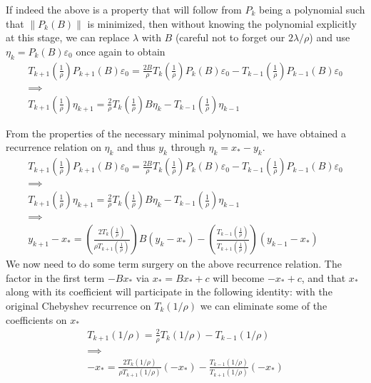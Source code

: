 \documentclass[11pt]{article}
\begin{document}
If indeed the above is a property that will follow from $P_k$ being a polynomial such that $\lVert P_k(B) \rVert$ is minimized, then without knowing the polynomial explicitly at this stage, we can replace $\lambda$ with $B$ (careful not to forget our $2\lambda/\rho$) and use $\eta_k = P_k(B) \varepsilon_0$ once again to obtain \begin{gather*}
T_{k+1}\left(\frac1\rho\right) P_{k+1}(B) \varepsilon_0 = \frac{2B}{\rho} T_k\left(\frac1\rho\right) P_k(B) \varepsilon_0 - T_{k-1}\left(\frac1\rho \right) P_{k-1} (B) \varepsilon_0 \\
\implies \\
T_{k+1}\left(\frac1\rho\right) \eta_{k+1} = \frac{2}{\rho} T_k\left(\frac1\rho\right) B \eta_k - T_{k-1}\left(\frac1\rho \right) \eta_{k-1}
\end{gather*}

From the properties of the necessary minimal polynomial, we have obtained a recurrence relation on $\eta_k$ and thus $y_k$ through $\eta_k = x_* - y_k$. \begin{gather*}
T_{k+1}\left(\frac1\rho\right) P_{k+1}(B) \varepsilon_0 = \frac{2B}{\rho} T_k\left(\frac1\rho\right) P_k(B) \varepsilon_0 - T_{k-1}\left(\frac1\rho \right) P_{k-1} (B) \varepsilon_0 \\
\implies \\
T_{k+1}\left(\frac1\rho\right) \eta_{k+1} = \frac{2}{\rho} T_k\left(\frac1\rho\right) B \eta_k - T_{k-1}\left(\frac1\rho \right) \eta_{k-1} \\
\implies \\
y_{k+1} - x_* = \left( \frac{2 T_k\left(\frac1\rho\right) }{\rho T_{k+1}\left(\frac1\rho\right) } \right)  B (y_k - x_*) - \left( \frac{T_{k-1} \left(\frac1\rho \right)}{T_{k+1}\left(\frac1\rho\right)} \right) (y_{k-1} - x_*)
\end{gather*}
We now need to do some term surgery on the above recurrence relation. The factor in the first term $-B x_*$ via $x_* = B x_* + c$ will become $-x_* + c$, and that $x_*$ along with its coefficient will participate in the following identity: with the original Chebyshev recurrence on $T_k(1/\rho)$ we can eliminate some of the coefficients on $x_*$ \begin{gather*}
T_{k+1} (1/\rho) = \frac{2}{\rho} T_k(1/\rho) - T_{k-1}(1/\rho) \\ \implies \\ - x_* = \frac{2 T_k (1/\rho)}{\rho T_{k+1} (1/\rho)} (-x_*) - \frac{T_{k-1}(1/\rho)}{T_{k+1}(1/\rho)} (-x_*)
\end{gather*}
\end{document}
